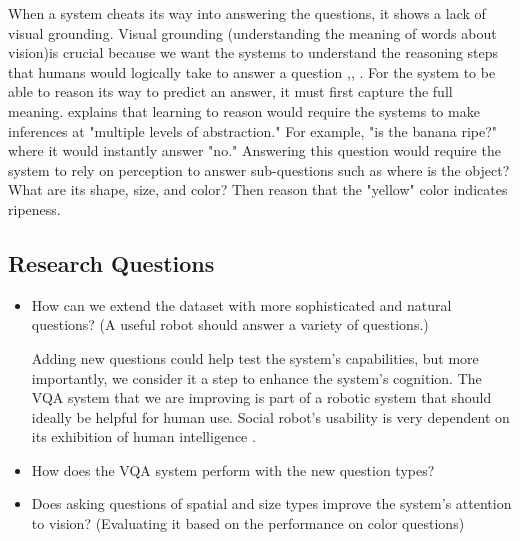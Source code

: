 When a system cheats its way into answering the questions, it shows a lack of visual grounding\cite {goyal2017making}. Visual grounding (understanding the meaning of words about vision)is crucial because we want the systems to understand the reasoning steps that humans would logically take to answer a question \cite{agrawal2016analyzing},\cite{zhang2016yin}, \cite {fukui2016multimodal}. For the system to be able to reason its way to predict an answer, it must first capture the full meaning. \cite{selvaraju2020squinting} explains that learning to reason would require the systems to make inferences at "multiple levels of abstraction." For example, "is the banana ripe?" where it would instantly answer "no."  Answering this question would require the system to rely on perception to answer sub-questions such as where is the object? What are its shape, size, and color? Then reason that the "yellow" color indicates ripeness.\cite{selvaraju2020squinting}

\subsection{Research Questions}
\begin{itemize}


\item How can we extend the dataset with more sophisticated and natural questions? (A useful robot should answer a variety of questions.)

Adding new questions could help test the system's capabilities, but more importantly, we consider it a step to enhance the system's cognition. The VQA system that we are improving is part of a robotic system that should ideally be helpful for human use. Social robot's usability is very dependent on its exhibition of human intelligence \cite{fong2003survey}.

\item How does the VQA system perform with the new question types? 

\item Does asking questions of spatial and size types improve the system's attention to vision? (Evaluating it based on the performance on color questions) 


\end{itemize}
 

